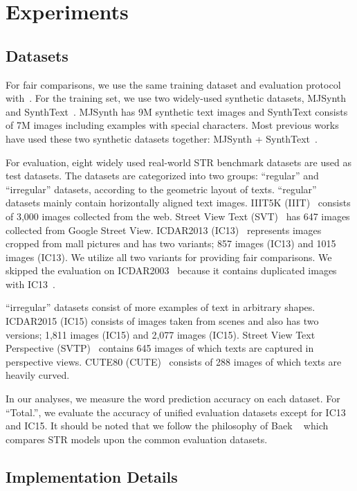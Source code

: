 \documentclass[runningheads]{llncs}
\begin{document}
\section{Experiments}

\subsection{Datasets}
For fair comparisons, we use the same training dataset and evaluation protocol with~\cite{ABINet,Yu_2020_CVPR_SRN}. For the training set, we use two widely-used synthetic datasets, MJSynth~\cite{Jaderberg14c_MJSynth} and SynthText~\cite{Gupta16_SynthText}. MJSynth has 9M synthetic text images and SynthText consists of 7M images including examples with special characters. Most previous works have used these two synthetic datasets together: MJSynth + SynthText~\cite{Baek_2019_ICCV_CombBest}.

For evaluation, eight widely used real-world STR benchmark datasets are used as test datasets. The datasets are categorized into two groups: ``regular'' and ``irregular'' datasets, according to the geometric layout of texts.  ``regular'' datasets mainly contain horizontally aligned text images. IIIT5K (IIIT)~\cite{IIIT5k} consists of 3,000 images collected from the web. Street View Text (SVT)~\cite{SVT} has 647 images collected from Google Street View. ICDAR2013 (IC13)~\cite{IC13} represents images cropped from mall pictures and has two variants; 857 images (IC13) and 1015 images (IC13). We utilize all two variants for providing fair comparisons. We skipped the evaluation  on ICDAR2003~\cite{IC03} because it contains duplicated images with IC13~\cite{Baek_2019_ICCV_CombBest}.

``irregular'' datasets consist of more examples of text in arbitrary shapes. 
ICDAR2015 (IC15) consists of images taken from scenes and also has two versions; 1,811 images (IC15) and 2,077 images (IC15). Street View Text Perspective (SVTP)~\cite{SVTP} contains 645 images of which texts are captured in perspective views. CUTE80 (CUTE)~\cite{CUTE80} consists of 288 images of which texts are heavily curved. 

In our analyses, we measure the word prediction accuracy on each dataset.
For ``Total.'', we evaluate the accuracy of unified evaluation datasets except for IC13 and IC15. It should be noted that we follow the philosophy of Baek \etal~\cite{Baek_2019_ICCV_CombBest} which compares STR models upon the common evaluation datasets.

\subsection{Implementation Details}
\label{sec:implementaion}
\end{document}
